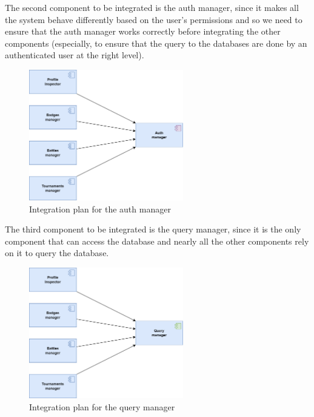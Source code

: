 The second component to be integrated is the auth manager, since it makes all the system behave differently based on the user's permissions and so we need to ensure that the auth manager works correctly before integrating the other components (especially, to ensure that the query to the databases are done by an authenticated user at the right level).\\

\begin{figure}[H]
    \centering
    \includegraphics[width=0.6\textwidth]{images/test_plan/test-plan-2.png}
    \caption{Integration plan for the auth manager}
    \label{fig:test-plan-2}
\end{figure}

The third component to be integrated is the query manager, since it is the only component that can access the database and nearly all the other components rely on it to query the database.\\

\begin{figure}[H]
    \centering
    \includegraphics[width=0.6\textwidth]{images/test_plan/test-plan-3.png}
    \caption{Integration plan for the query manager}
    \label{fig:test-plan-3}
\end{figure}

